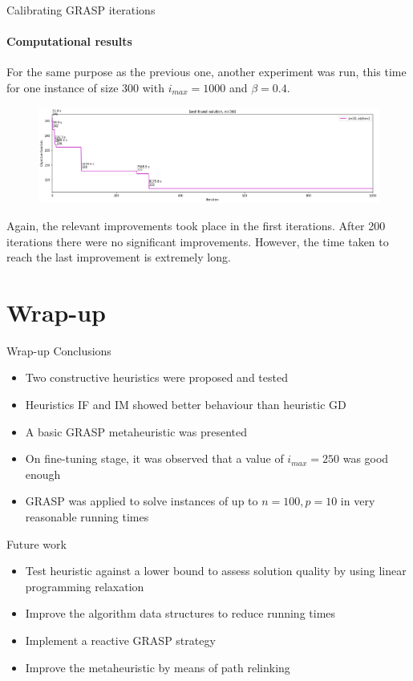 \documentclass{beamer}
\begin{document}
\begin{frame}{Calibrating GRASP iterations}
    \framesubtitle{Computational results}
    
    For the same purpose as the previous one, another experiment was run, this time for one instance of size 300 with $i_{max} = 1000$ and $\beta = 0.4$.
    
    \begin{figure}
        \centering
        \includegraphics[scale=0.29]{grasp_iters_n300}
    \end{figure}
    
    Again, the relevant improvements took place in the first iterations.
    After 200 iterations there were no significant improvements.
    However, the time taken to reach the last improvement is extremely long.
\end{frame}

\section{Wrap-up}

\begin{frame}{Wrap-up}
    Conclusions
    \begin{itemize}
        \item Two constructive heuristics were proposed and tested
        \item Heuristics IF and IM showed better behaviour than heuristic GD
        \item A basic GRASP metaheuristic was presented
        \item On fine-tuning stage, it was observed that a value of $i_{max} = 250$ was good enough
        \item GRASP was applied to solve instances of up to $n = 100, p = 10$ in very reasonable running times
    \end{itemize}
    
    Future work
    \begin{itemize}
        \item Test heuristic against a lower bound to assess solution quality by using linear programming relaxation
        \item Improve the algorithm data structures to reduce running times
        \item Implement a reactive GRASP strategy
        \item Improve the metaheuristic by means of path relinking
    \end{itemize}
\end{frame}
\end{document}
